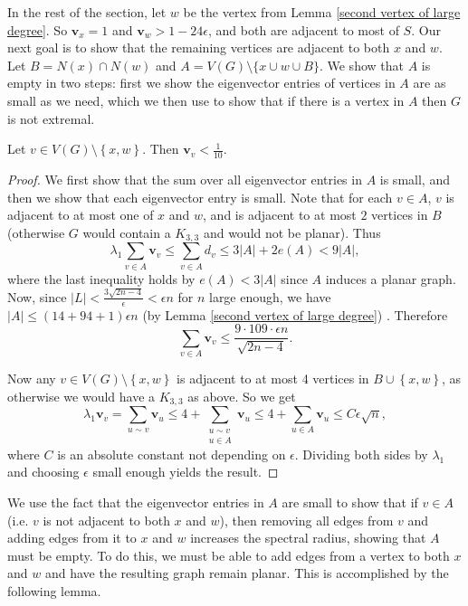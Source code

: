 In the rest of the section, let $w$ be the vertex from Lemma \ref{second vertex of large degree}. So $\mathbf{v}_x=1$ and $\mathbf{v}_w> 1-24\epsilon$, and both are adjacent to most of $S$. Our next goal is to show that the remaining vertices are adjacent to both $x$ and $w$. Let $B = N(x) \cap N(w)$ and $A = V(G) \setminus \{x\cup w \cup B\}$. We show that $A$ is empty in two steps: first we show the eigenvector entries of vertices in $A$ are as small as we need, which we then use to show that if there is a vertex in $A$ then $G$ is not extremal.

\begin{lemma}\label{eigenvector entries of A small}
Let $v\in V(G) \setminus \left\{ x,w \right\}$. Then $\mathbf{v}_v < \frac{1}{10}$.
\end{lemma}

\begin{proof}
We first show that the sum over all eigenvector entries in $A$ is small, and then we show that each eigenvector entry is small. Note that for each $v\in A$, $v$ is adjacent to at most one of $x$ and $w$, and is adjacent to at most $2$ vertices in $B$ (otherwise $G$ would contain a $K_{3,3}$ and would not be planar). Thus
\[
\lambda_1\sum_{v\in A} \mathbf{v}_v \leq \sum_{v\in A} d_v \leq 3|A| +2e(A) < 9|A|,
\]
where the last inequality holds by $e(A) < 3|A|$ since $A$ induces a planar graph. Now, since $|L| < \frac{3\sqrt{2n-4}}{\epsilon} < \epsilon n$ for $n$ large enough, we have $|A| \leq (14+94+1)\epsilon n$ (by Lemma \ref{second vertex of large degree}) . Therefore 
\[
\sum_{v\in A} \mathbf{v}_v \leq \frac{9\cdot 109 \cdot \epsilon n}{\sqrt{2n-4}}.
\]

Now any $v\in V(G) \setminus \left\{ x,w \right\}$ is adjacent to at most 4 vertices in $B \cup \left\{x,w \right\}$, as otherwise we would have a $K_{3,3}$
as above.  So we get
\[
\lambda_1\mathbf{v}_v = \sum_{u\sim v} \mathbf{v}_u \leq 4 + \sum_{\substack{u\sim v\\ u\in A}} \mathbf{v}_u \leq 4 + \sum_{u\in A} \mathbf{v}_u \leq C\epsilon\sqrt{n},
\]
where $C$ is an absolute constant not depending on $\epsilon$. Dividing both sides by $\lambda_1$ and choosing $\epsilon$ small enough yields the result.
\end{proof}

We use the fact that the eigenvector entries in $A$ are small to show that if $v\in A$ (i.e. $v$ is not adjacent to both $x$ and $w$), then removing all edges from $v$ and adding edges from it to $x$ and $w$ increases the spectral radius, showing that $A$ must be empty. To do this, we must be able to add edges from a vertex to both $x$ and $w$ and have the resulting graph remain planar. This is accomplished by the following lemma.

